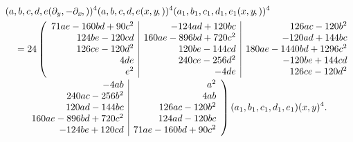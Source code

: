 \documentclass[11pt,a4paper]{article}
\newcommand{\fcn}[2]{(#1\kern-1pt, #2)}
\begin{document}
\begingroup
\scriptsize
\[
\begin{aligned}
&(a,b,c,d,e\fcn{\partial_y,-\partial_x})^4
 (a,b,c,d,e\fcn{x,y})^4
 (a_1,b_1,c_1,d_1,e_1\fcn{x,y})^4\\
&\quad =
24\left(
\begin{array}{r|r|r}
  71ae-160bd+90c^2
    & -124ad+120bc
    & 126ac-120b^2\\
  124be-120cd
    & 160ae-896bd+720c^2
    & -120ad+144bc\\
  126ce-120d^2
    & 120be-144cd
    & 180ae-1440bd+1296c^2\\
  4de
    & 240ce-256d^2
    & -120be+144cd\\
  e^2
    & -4de
    & 126ce-120d^2
\end{array}
\right.\\[-0.2em]
&\qquad\left.
\begin{array}{r|r}
  -4ab
    & a^2\\
  240ac-256b^2
    & 4ab\\
  120ad-144bc
    & 126ac-120b^2\\
  160ae-896bd+720c^2
    & 124ad-120bc\\
  -124be+120cd
    & 71ae-160bd+90c^2
\end{array}
\right)(a_1,b_1,c_1,d_1,e_1)(x,y)^4 .
\end{aligned}
\]
\end{document}
